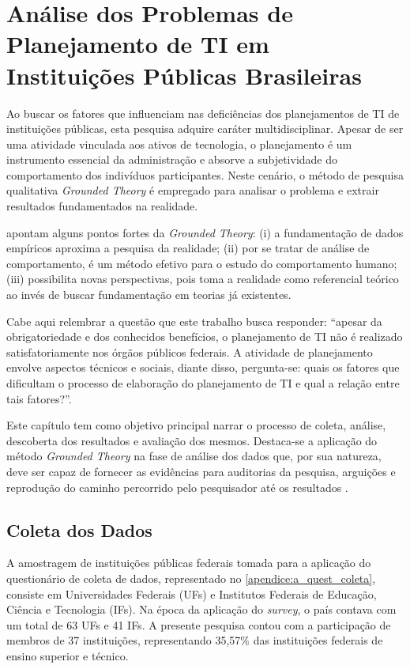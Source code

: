 \chapter{Análise dos Problemas de Planejamento de TI em Instituições Públicas Brasileiras}
\label{capitulo:analise_dos_problemas}
Ao buscar os fatores que influenciam nas deficiências dos planejamentos de TI de instituições públicas, esta pesquisa adquire caráter multidisciplinar. Apesar de ser uma atividade vinculada aos ativos de tecnologia, o planejamento é um instrumento essencial da administração e absorve a subjetividade do comportamento dos indivíduos participantes. Neste cenário, o método de pesquisa qualitativa \textit{Grounded Theory} é empregado para analisar o problema e extrair resultados fundamentados na realidade.

 apontam alguns pontos fortes da \textit{Grounded Theory}: (i) a fundamentação de dados empíricos  aproxima a pesquisa da realidade; (ii) por se tratar de análise de comportamento, é um método efetivo para o estudo do comportamento humano; (iii) possibilita novas perspectivas, pois toma a realidade como referencial teórico ao invés de buscar fundamentação em teorias já existentes.

Cabe aqui relembrar a questão que este trabalho busca responder: ``apesar da obrigatoriedade e dos conhecidos benefícios, o planejamento de TI não é realizado satisfatoriamente nos órgãos públicos federais. A atividade de planejamento envolve aspectos técnicos e sociais, diante disso, pergunta-se: quais os fatores que dificultam o processo de elaboração do planejamento de TI e qual a relação entre tais fatores?''.

Este capítulo tem como objetivo principal narrar o processo de coleta, análise, descoberta dos resultados e avaliação dos mesmos. Destaca-se a aplicação do método \textit{Grounded Theory} na fase de análise dos dados que, por sua natureza, deve ser capaz de fornecer as evidências para auditorias da pesquisa, arguições e reprodução do caminho percorrido pelo pesquisador até os resultados \cite{corbin:98}.

\section{Coleta dos Dados}

A amostragem de instituições públicas federais tomada para a aplicação do questionário de coleta de dados, representado no \autoref{apendice:a_quest_coleta}, consiste em Universidades Federais (UFs) e Institutos Federais de Educação, Ciência e Tecnologia (IFs). Na época da aplicação do \textit{survey}, o país contava com um total de 63 UFs e 41 IFs. A presente pesquisa contou com a participação de membros de 37 instituições, representando 35,57\% das instituições federais de ensino superior e técnico.

